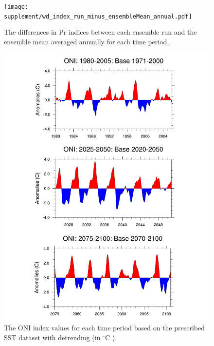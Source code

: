 \begin{figure}
\begin{center}
\texttt{[image: supplement/wd\_index\_run\_minus\_ensembleMean\_annual.pdf]}
\caption{The differences in Pr indices between each ensemble run and the ensemble mean averaged annually for each time period.}
\label{fig:S1}
\end{center}
\end{figure}
%
\begin{figure}
\begin{center}
\includegraphics[width=6in]{supplement/indices_oni.pdf}
\caption{The ONI index values for each time period based on the prescribed SST dataset with detrending (in $^\circ$C ).}
\end{center}
\label{fig:S2}
\end{figure}

